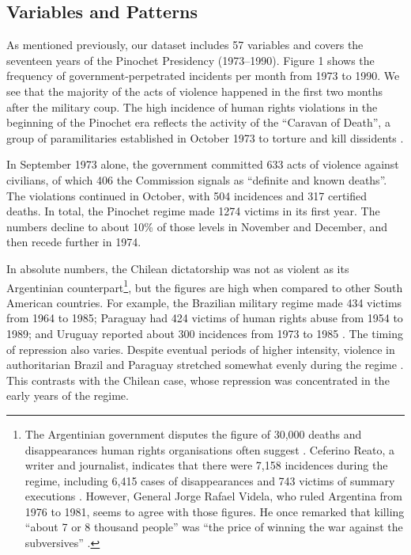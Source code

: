 \documentclass[12pt,a4paper,]{article}
\begin{document}
\hypertarget{variables-and-patterns}{%
\subsection{Variables and Patterns}\label{variables-and-patterns}}

As mentioned previously, our dataset includes 57 variables and covers
the seventeen years of the Pinochet Presidency (1973--1990). Figure 1
shows the frequency of government-perpetrated incidents per month from
1973 to 1990. We see that the majority of the acts of violence happened
in the first two months after the military coup. The high incidence of
human rights violations in the beginning of the Pinochet era reflects
the activity of the ``Caravan of Death'', a group of paramilitaries
established in October 1973 to torture and kill dissidents
\citetext{\citealp[459]{davis1990they}; \citealp{verdugo2001chile}}.

In September 1973 alone, the government committed 633 acts of violence
against civilians, of which 406 the Commission signals as ``definite and
known deaths''. The violations continued in October, with 504 incidences
and 317 certified deaths. In total, the Pinochet regime made 1274
victims in its first year. The numbers decline to about 10\% of those
levels in November and December, and then recede further in 1974.

In absolute numbers, the Chilean dictatorship was not as violent as its
Argentinian counterpart\footnote{The Argentinian government disputes the
  figure of 30,000 deaths and disappearances human rights organisations
  often suggest \citep{bbc2016argentina, elpais2016argentina}. Ceferino
  Reato, a writer and journalist, indicates that there were 7,158
  incidences during the regime, including 6,415 cases of disappearances
  and 743 victims of summary executions \citep{clarin2016argentina}.
  However, General Jorge Rafael Videla, who ruled Argentina from 1976 to
  1981, seems to agree with those figures. He once remarked that killing
  ``about 7 or 8 thousand people'' was ``the price of winning the war
  against the subversives'' \citep{clarin2012videla}.}, but the figures
are high when compared to other South American countries. For example,
the Brazilian military regime made 434 victims from 1964 to 1985;
Paraguay had 424 victims of human rights abuse from 1954 to 1989; and
Uruguay reported about 300 incidences from 1973 to 1985
\citep{elpais2014ditadura, fsp2016argentina}. The timing of repression
also varies. Despite eventual periods of higher intensity, violence in
authoritarian Brazil and Paraguay stretched somewhat evenly during the
regime \citep{agenciabrasil2014ditadura, elpais2014ditadura}. This
contrasts with the Chilean case, whose repression was concentrated in
the early years of the regime.
\end{document}
